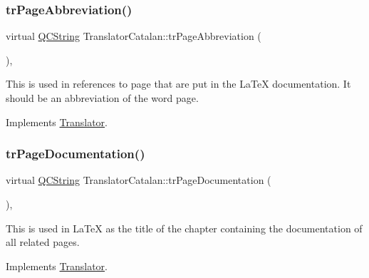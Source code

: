 \mbox{\label{class_translator_catalan_a583bdd23ddb82bcc56fdb050afc0c988}} 
\subsubsection{\texorpdfstring{trPageAbbreviation()}{trPageAbbreviation()}}
{\footnotesize\ttfamily virtual \mbox{\hyperlink{class_q_c_string}{Q\+C\+String}} Translator\+Catalan\+::tr\+Page\+Abbreviation (\begin{DoxyParamCaption}{ }\end{DoxyParamCaption})\hspace{0.3cm}{\ttfamily [inline]}, {\ttfamily [virtual]}}

This is used in references to page that are put in the La\+TeX documentation. It should be an abbreviation of the word page. 

Implements \mbox{\hyperlink{class_translator}{Translator}}.

\mbox{\label{class_translator_catalan_af4a13ce2afa013ca0f055b4d781bd311}} 
\subsubsection{\texorpdfstring{trPageDocumentation()}{trPageDocumentation()}}
{\footnotesize\ttfamily virtual \mbox{\hyperlink{class_q_c_string}{Q\+C\+String}} Translator\+Catalan\+::tr\+Page\+Documentation (\begin{DoxyParamCaption}{ }\end{DoxyParamCaption})\hspace{0.3cm}{\ttfamily [inline]}, {\ttfamily [virtual]}}

This is used in La\+TeX as the title of the chapter containing the documentation of all related pages. 

Implements \mbox{\hyperlink{class_translator}{Translator}}.

\mbox{\label{class_translator_catalan_a27b917b26e44f47561b7e9f35114d9d0}} 
